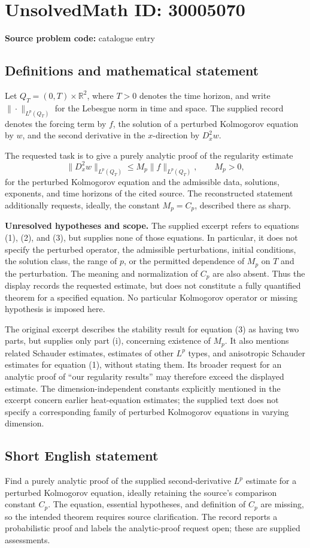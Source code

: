 \documentclass[11pt]{article}
\newcommand{\R}{\mathbb{R}}
\begin{document}
\section*{UnsolvedMath ID: 30005070}
\textbf{Source problem code:} catalogue entry
\subsection{Definitions and mathematical statement}
Let \(Q_T=(0,T)\times\R^2\), where \(T>0\) denotes the time horizon, and write \(\|\cdot\|_{L^p(Q_T)}\) for the Lebesgue norm in time and space. The supplied record denotes the forcing term by \(f\), the solution of a perturbed Kolmogorov equation by \(w\), and the second derivative in the \(x\)-direction by \(D_x^2w\).

The requested task is to give a purely analytic proof of the regularity estimate
\[
\|D_x^2w\|_{L^p(Q_T)}\leq M_p\|f\|_{L^p(Q_T)},\qquad M_p>0,
\]
for the perturbed Kolmogorov equation and the admissible data, solutions, exponents, and time horizons of the cited source. The reconstructed statement additionally requests, ideally, the constant \(M_p=C_p\), described there as sharp.

\textbf{Unresolved hypotheses and scope.} The supplied excerpt refers to equations (1), (2), and (3), but supplies none of those equations. In particular, it does not specify the perturbed operator, the admissible perturbations, initial conditions, the solution class, the range of \(p\), or the permitted dependence of \(M_p\) on \(T\) and the perturbation. The meaning and normalization of \(C_p\) are also absent. Thus the display records the requested estimate, but does not constitute a fully quantified theorem for a specified equation. No particular Kolmogorov operator or missing hypothesis is imposed here.

The original excerpt describes the stability result for equation (3) as having two parts, but supplies only part (i), concerning existence of \(M_p\). It also mentions related Schauder estimates, estimates of other \(L^p\) types, and anisotropic Schauder estimates for equation (1), without stating them. Its broader request for an analytic proof of ``our regularity results'' may therefore exceed the displayed estimate. The dimension-independent constants explicitly mentioned in the excerpt concern earlier heat-equation estimates; the supplied text does not specify a corresponding family of perturbed Kolmogorov equations in varying dimension.
\subsection{Short English statement}
Find a purely analytic proof of the supplied second-derivative \(L^p\) estimate for a perturbed Kolmogorov equation, ideally retaining the source's comparison constant \(C_p\). The equation, essential hypotheses, and definition of \(C_p\) are missing, so the intended theorem requires source clarification. The record reports a probabilistic proof and labels the analytic-proof request open; these are supplied assessments.
\end{document}
